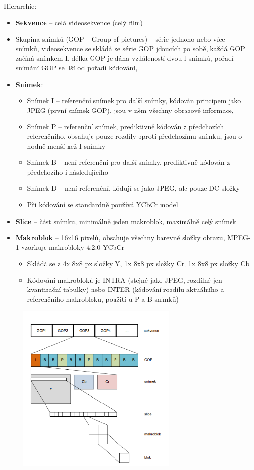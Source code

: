 \newpage
Hierarchie:
\begin{itemize}
    \item \textbf{Sekvence} – celá videosekvence (celý film)
 \item Skupina snímků (GOP – Group of pictures) – série jednoho nebo více snímků, videosekvence se skládá ze série GOP
jdoucích po sobě, každá GOP začíná snímkem I, délka GOP je dána vzdáleností dvou I snímků, pořadí snímání GOP
se liší od pořadí kódování,
 \item \textbf{Snímek}:
 \begin{itemize}
     \item Snímek I – referenční snímek pro další snímky, kódován principem jako JPEG (první snímek GOP), jsou v něm
všechny obrazové informace,
\item Snímek P – referenční snímek, prediktivně kódován z předchozích referenčního, obsahuje pouze rozdíly oproti
předchozímu snímku, jsou o hodně menší než I snímky
\item Snímek B – není referenční pro další snímky, prediktivně kódován z předchozího i následujícího
\item Snímek D – není referenční, kódují se jako JPEG, ale pouze DC složky
\item Při kódování se standardně používá YCbCr model
 \end{itemize}
 \item \textbf{Slice} – část snímku, minimálně jeden makroblok, maximálně celý snímek
 \item \textbf{Makroblok} – 16x16 pixelů, obsahuje všechny barevné složky obrazu, MPEG-1 vzorkuje makrobloky 4:2:0 YCbCr
 \begin{itemize}
     \item Skládá se z 4x 8x8 px složky Y, 1x 8x8 px složky Cr, 1x 8x8 px složky Cb
\item Kódování makrobloků je INTRA (stejné jako JPEG, rozdílné jen kvantizační tabulky) nebo INTER (kódování rozdílu
aktuálního a referenčního makrobloku, použití u P a B snímků)
 \end{itemize}
\end{itemize}

\begin{figure} [h]
     \centering
     \includegraphics[width=0.7\textwidth]{images/mpeg-1.PNG}
\end{figure}

